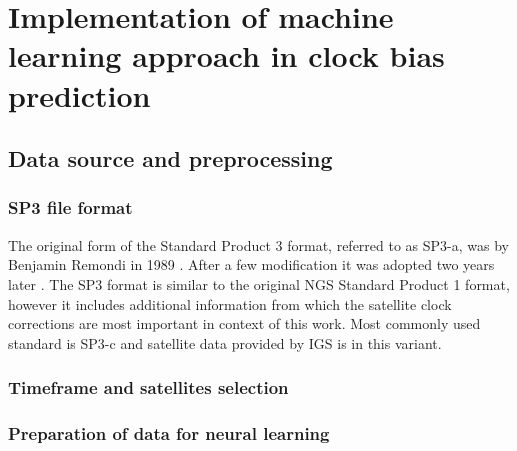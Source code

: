 \FloatBarrier
\chapter{Implementation of machine learning approach in clock bias prediction}


\FloatBarrier
\section{Data source and preprocessing}

\FloatBarrier
\subsection{SP3 file format}
The original form of the Standard Product 3 format, referred to as SP3-a, was by Benjamin Remondi 
in 1989 \cite{Remondi1989}.
After a few modification it was adopted two years later \cite{Remondi1991}. 
The SP3 format is similar to the original NGS Standard Product 1 format, however it includes
additional information from which the satellite clock corrections are most important in context
of this work.
Most commonly used standard is SP3-c and satellite data provided by IGS is in this variant. 

\FloatBarrier
\subsection{Timeframe and satellites selection}

\FloatBarrier
\subsection{Preparation of data for neural learning}

